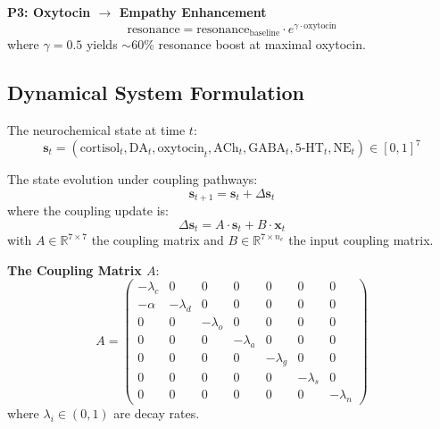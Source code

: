 \documentclass[preprint,12pt]{elsarticle}
\newcommand{\R}{\mathbb{R}}
\begin{document}
\textbf{P3: Oxytocin $\rightarrow$ Empathy Enhancement}
\begin{equation}
\text{resonance} = \text{resonance}_{\text{baseline}} \cdot e^{\gamma \cdot \text{oxytocin}}
\end{equation}
where $\gamma = 0.5$ yields $\sim$60\% resonance boost at maximal oxytocin.

\subsection{Dynamical System Formulation}

\begin{definition}
The neurochemical state at time $t$:
\begin{equation}
\mathbf{s}_t = (\text{cortisol}_t, \text{DA}_t, \text{oxytocin}_t, \text{ACh}_t, \text{GABA}_t, \text{5-HT}_t, \text{NE}_t) \in [0, 1]^7
\end{equation}
\end{definition}

\begin{definition}
The state evolution under coupling pathways:
\begin{equation}
\mathbf{s}_{t+1} = \mathbf{s}_t + \Delta \mathbf{s}_t
\end{equation}
where the coupling update is:
\begin{equation}
\Delta \mathbf{s}_t = A \cdot \mathbf{s}_t + B \cdot \mathbf{x}_t
\end{equation}
with $A \in \R^{7 \times 7}$ the coupling matrix and $B \in \R^{7 \times n_e}$ the input coupling matrix.
\end{definition}

\textbf{The Coupling Matrix $A$}:
\begin{equation}
A = \begin{pmatrix}
-\lambda_c & 0 & 0 & 0 & 0 & 0 & 0 \\
-\alpha & -\lambda_d & 0 & 0 & 0 & 0 & 0 \\
0 & 0 & -\lambda_o & 0 & 0 & 0 & 0 \\
0 & 0 & 0 & -\lambda_a & 0 & 0 & 0 \\
0 & 0 & 0 & 0 & -\lambda_g & 0 & 0 \\
0 & 0 & 0 & 0 & 0 & -\lambda_s & 0 \\
0 & 0 & 0 & 0 & 0 & 0 & -\lambda_n
\end{pmatrix}
\end{equation}
where $\lambda_i \in (0, 1)$ are decay rates.
\end{document}
